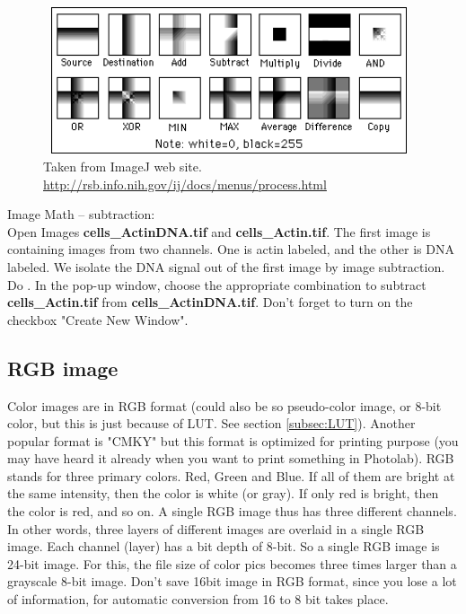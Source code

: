 \begin{figure}[htbp]
\begin{center}
\includegraphics[width=10.945cm,height=4.323cm]{fig/CMCIBasicCourse201102-img13.png}
\caption{Taken from ImageJ web site. \url{http://rsb.info.nih.gov/ij/docs/menus/process.html}}
\label{fig:img13}
\end{center}
\end{figure}

\begin{indentexercise}{1}
Image Math -- subtraction:\\
Open Images \textbf{cells\_ActinDNA.tif} and \textbf{cells\_Actin.tif}.
The first image is containing images from two channels. One is actin
labeled, and the other is DNA labeled. We isolate the DNA signal out of
the first image by image subtraction. Do . In the pop-up window, choose the appropriate combination to subtract \textbf{cells\_Actin.tif} from \textbf{cells\_ActinDNA.tif}. Don't forget to turn on the checkbox "Create New Window". 
\end{indentexercise}


\subsection{RGB image}

Color images are in RGB format (could also be so pseudo-color image, or
8-bit color, but this is just because of LUT. See section \ref{subsec:LUT}).
Another popular format is "CMKY" but this
format is optimized for printing purpose (you may have heard it already
when you want to print something in Photolab). RGB stands for three
primary colors. Red, Green and Blue. If all of them are bright at the
same intensity, then the color is white (or gray). If only red is
bright, then the color is red, and so on. A single RGB image thus has
three different channels. In other words, three layers of different
images are overlaid in a single RGB image. Each channel (layer) has a
bit depth of 8-bit. So a single RGB image is 24-bit image. For this,
the file size of color pics becomes three times larger than a grayscale
8-bit image. Don't save 16bit image in RGB format,
since you lose a lot of information, for automatic conversion from 16
to 8 bit takes place. 

